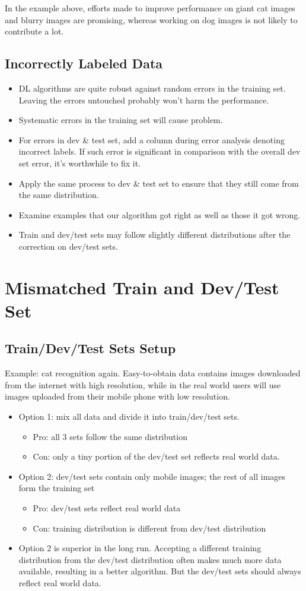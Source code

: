 In the example above, efforts made to improve performance on giant cat images and blurry images are promising, whereas working on dog images is not likely to contribute a lot.
\subsection{Incorrectly Labeled Data}
\begin{itemize}
  \item DL algorithms are quite robust against random errors in the training set. Leaving the errors untouched probably won't harm the performance.
  \item Systematic errors in the training set will cause problem.
  \item For errors in dev \& test set, add a column during error analysis denoting incorrect labels. If such error is significant in comparison with the overall dev set error, it's worthwhile to fix it.
  \item Apply the same process to dev \& test set to ensure that they still come from the same distribution.
  \item Examine examples that our algorithm got right as well as those it got wrong.
  \item Train and dev/test sets may follow slightly different distributions after the correction on dev/test sets.
\end{itemize}
\section{Mismatched Train and Dev/Test Set}
\subsection{Train/Dev/Test Sets Setup}
Example: cat recognition again. Easy-to-obtain data contains images downloaded from the internet with high resolution, while in the real world users will use images uploaded from their mobile phone with low resolution.
\begin{itemize}
  \item Option 1: mix all data and divide it into train/dev/test sets. 
  \begin{itemize}
    \item Pro: all 3 sets follow the same distribution
    \item Con: only a tiny portion of the dev/test set reflects real world data.
  \end{itemize}
  \item Option 2: dev/test sets contain only mobile images; the rest of all images form the training set
  \begin{itemize}
    \item Pro: dev/test sets reflect real world data
    \item Con: training distribution is different from dev/test distribution
  \end{itemize}
  \item Option 2 is superior in the long run. Accepting a different training distribution from the dev/test distribution often makes much more data available, resulting in a better algorithm. But the dev/test sets should always reflect real world data.
\end{itemize}

